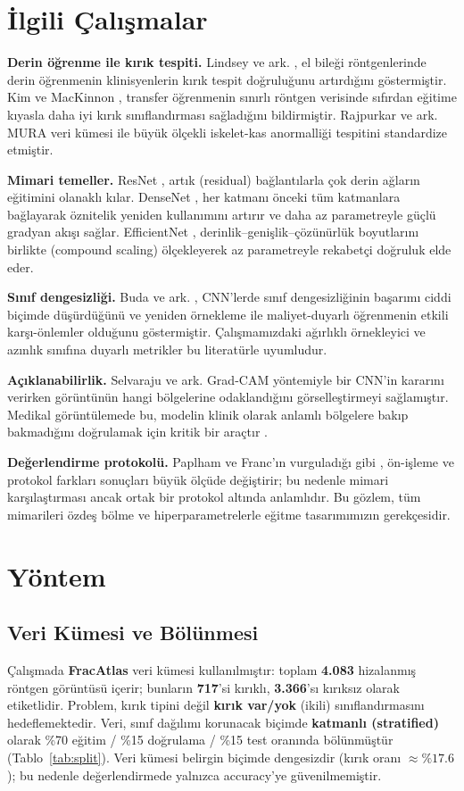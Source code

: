\documentclass[conference]{IEEEtran}
\begin{document}
\section{İlgili Çalışmalar}
\textbf{Derin öğrenme ile kırık tespiti.} Lindsey ve ark. \cite{lindsey}, el bileği röntgenlerinde derin öğrenmenin klinisyenlerin kırık tespit doğruluğunu artırdığını göstermiştir. Kim ve MacKinnon \cite{kim}, transfer öğrenmenin sınırlı röntgen verisinde sıfırdan eğitime kıyasla daha iyi kırık sınıflandırması sağladığını bildirmiştir. Rajpurkar ve ark. \cite{mura} MURA veri kümesi ile büyük ölçekli iskelet-kas anormalliği tespitini standardize etmiştir.

\textbf{Mimari temeller.} ResNet \cite{resnet}, artık (residual) bağlantılarla çok derin ağların eğitimini olanaklı kılar. DenseNet \cite{densenet}, her katmanı önceki tüm katmanlara bağlayarak öznitelik yeniden kullanımını artırır ve daha az parametreyle güçlü gradyan akışı sağlar. EfficientNet \cite{efficientnet}, derinlik--genişlik--çözünürlük boyutlarını birlikte (compound scaling) ölçekleyerek az parametreyle rekabetçi doğruluk elde eder.

\textbf{Sınıf dengesizliği.} Buda ve ark. \cite{buda}, CNN'lerde sınıf dengesizliğinin başarımı ciddi biçimde düşürdüğünü ve yeniden örnekleme ile maliyet-duyarlı öğrenmenin etkili karşı-önlemler olduğunu göstermiştir. Çalışmamızdaki ağırlıklı örnekleyici ve azınlık sınıfına duyarlı metrikler bu literatürle uyumludur.

\textbf{Açıklanabilirlik.} Selvaraju ve ark. \cite{gradcam} Grad-CAM yöntemiyle bir CNN'in kararını verirken görüntünün hangi bölgelerine odaklandığını görselleştirmeyi sağlamıştır. Medikal görüntülemede bu, modelin klinik olarak anlamlı bölgelere bakıp bakmadığını doğrulamak için kritik bir araçtır \cite{litjens}.

\textbf{Değerlendirme protokolü.} Paplham ve Franc'ın vurguladığı gibi \cite{paplham}, ön-işleme ve protokol farkları sonuçları büyük ölçüde değiştirir; bu nedenle mimari karşılaştırması ancak ortak bir protokol altında anlamlıdır. Bu gözlem, tüm mimarileri özdeş bölme ve hiperparametrelerle eğitme tasarımımızın gerekçesidir.

\section{Yöntem}
\subsection{Veri Kümesi ve Bölünmesi}
Çalışmada \textbf{FracAtlas} \cite{fracatlas} veri kümesi kullanılmıştır: toplam \textbf{4.083} hizalanmış röntgen görüntüsü içerir; bunların \textbf{717}'si kırıklı, \textbf{3.366}'sı kırıksız olarak etiketlidir. Problem, kırık tipini değil \textbf{kırık var/yok} (ikili) sınıflandırmasını hedeflemektedir. Veri, sınıf dağılımı korunacak biçimde \textbf{katmanlı (stratified)} olarak \%70 eğitim / \%15 doğrulama / \%15 test oranında bölünmüştür (Tablo~\ref{tab:split}). Veri kümesi belirgin biçimde dengesizdir (kırık oranı $\approx \%17.6$); bu nedenle değerlendirmede yalnızca accuracy'ye güvenilmemiştir.
\end{document}
